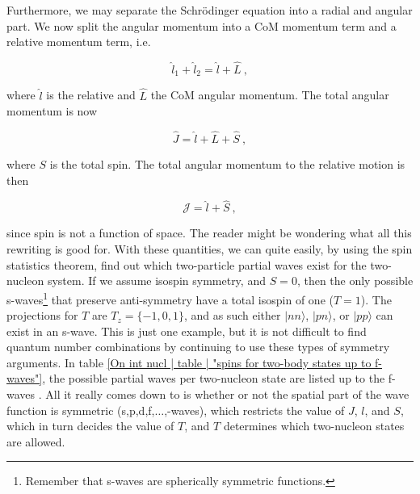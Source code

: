 \documentclass[10pt,twoside]{report}
\begin{document}
	Furthermore, we may separate the Schr\"odinger equation into a radial and angular part. We now split the angular momentum into a CoM momentum term and a relative momentum term, i.e.
	
	\begin{equation}
		\hat{l}_1 + \hat{l}_2 = \hat{l} + \hat{L}\:,
	\end{equation}
	
	where $\hat{l}$ is the relative and $\hat{L}$ the CoM angular momentum. The total angular momentum is now
	
	\begin{equation}
		\hat{J} = \hat{l} + \hat{L} + \hat{S}\:,
	\end{equation}
	
	\noindent where $S$ is the total spin. The total angular momentum to the relative motion is then
	
	\begin{equation}
		\mathcal{J} = \hat{l} + \hat{S}\:,
	\end{equation}
	
	\noindent since spin is not a function of space. The reader might be wondering what all this rewriting is good for. With these quantities, we can quite easily, by using the spin statistics theorem, find out which two-particle partial waves exist for the two-nucleon system. If we assume isospin symmetry, and $S=0$, then the only possible s-waves\footnote{Remember that s-waves are spherically symmetric functions.} that preserve anti-symmetry have a total isospin of one ($T=1$). The projections for $T$ are $T_z=\{-1,0,1\}$, and as such either $|nn\rangle$, $|pn\rangle$, or $|pp\rangle$ can exist in an s-wave. This is just one example, but it is not difficult to find quantum number combinations by continuing to use these types of symmetry arguments. In table \ref{On int nucl | table | "spins for two-body states up to f-waves"}, the possible partial waves per two-nucleon state are listed up to the f-waves \cite{phy981}. All it really comes down to is whether or not the spatial part of the wave function is symmetric (s,p,d,f,$\ldots$,-waves), which restricts the value of $J$, $l$, and $S$, which in turn decides the value of $T$, and $T$ determines which two-nucleon states are allowed.
	
\end{document}
